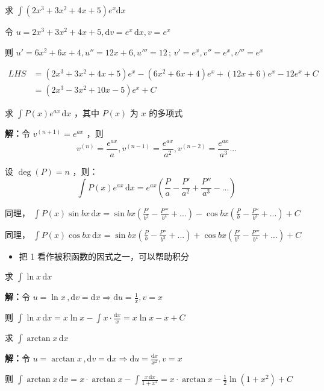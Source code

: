 \begin{example}{}
求 $\displaystyle{\int\left(2x^3+3x^2+4x+5\right)e^x\mathrm {d}x}$ 

令 $\displaystyle{u=2x^3+3x^2+4x+5,\mathrm{d}v=e^x\,\mathrm{d}x,v=e^x}$

则 $\displaystyle{u'=6x^2+6x+4,u''=12x+6,u'''=12\,;\,v'=e^x,v''=e^x,v'''=e^x}$ 

\begin{equation}
\begin{aligned}
LHS&=(2x^3+3x^2+4x+5)e^x-(6x^2+6x+4)e^x+(12x+6)e^x-12e^x+C \\
&=(2x^3-3x^2+10x-5)e^x+C
\end{aligned}
\end{equation}

\end{example}
\begin{corollary}{}
求 $\displaystyle{\int P(x)e^{ax}\,\mathrm{d}x}$ ，其中 $P(x)$ 为 $x$ 的多项式

\textbf{解：}令 $v^{(n+1)}=e^{ax}$ ，则
$$v^{(n)}=\frac{e^{ax}}{a},v^{(n-1)}=\frac{e^{ax}}{a^2},v^{(n-2)}=\frac{e^{ax}}{a^3}...$$ 

设 $\deg (P)=n$ ，则：
$$\int P(x)e^{ax}\,\mathrm{d}x=e^{ax}\left(\frac{P}{a}-\frac{P'}{a^2}+\frac{P''}{a^3}-...\right)$$

同理， $\displaystyle{\int P(x)\sin bx\,\mathrm{d}x=\sin bx\left(\frac{P'}{b^2}-\frac{P'''}{b^4}+...\right)-\cos bx\left(\frac{P}{b}-\frac{P''}{b^3}+...\right)+C}$

同理， $\displaystyle{\int P(x)\cos bx\,\mathrm{d}x=\sin bx\left(\frac{P}{b}-\frac{P''}{b^3}+...\right)+\cos bx\left(\frac{P'}{b^2}-\frac{P'''}{b^4}+...\right)+C}$
\end{corollary}
\begin{itemize}
\item 把 1 看作被积函数的因式之一，可以帮助积分
\end{itemize}
\begin{corollary}{}
求 $\displaystyle{\int \ln x\,\mathrm{d}x}$

\textbf{解：}令 $\displaystyle{u=\ln x\,,\mathrm{d}v=\mathrm{d}x\Rightarrow \mathrm{d}u=\frac{1}{x},v=x}$ 

则 $\displaystyle{\int \ln x\,\mathrm{d}x=x\ln x-\int x\cdot\frac{\mathrm{d}x}x=x\ln x-x+C}$
\end{corollary}
\begin{corollary}{}
求 $\displaystyle{\int\arctan x\,\mathrm{d}x}$

\textbf{解：}令 $\displaystyle{u=\arctan x\,,\mathrm{d}v=\mathrm{d}x\Rightarrow \mathrm{d}u=\frac{\mathrm{d}x}{x^2},v=x}$

则 $\displaystyle{\int\arctan x\,\mathrm{d}x=x\cdot \arctan x-\int\frac{x\,\mathrm{d}x}{1+x^2}=x\cdot \arctan x-\frac{1}{2}\ln\left(1+x^2\right)+C}$ 
\end{corollary}
